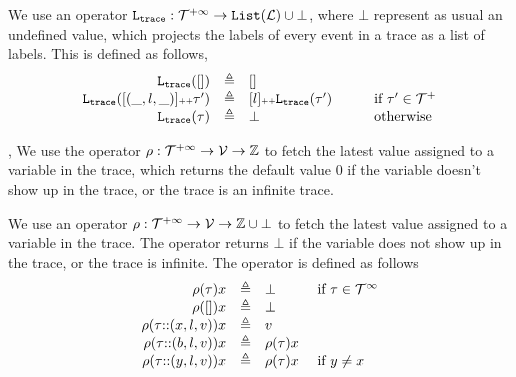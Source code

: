 We use an operator $\mathtt{L}_{\mathtt{{trace}}}: \mathcal{T}^{+\infty} \to \mathtt{List}(\mathcal{L})\cup \bot$, where $\bot$ represent as usual an undefined value, which projects the labels of every event in a trace as a list of labels. This is defined as follows,
\[
\begin{array}{rcll}
\mathtt{L}_{\mathtt{{trace}}}([]) &\triangleq & [] &\qquad  
\\ 
\mathtt{L}_{\mathtt{{trace}}}([(\_, l, \_)] {\scriptscriptstyle ++} \mathtt{\tau}') &\triangleq & [l] {\scriptscriptstyle ++} \mathtt{L}_{\mathtt{{trace}}}(\mathtt{\tau}') &\qquad  \mbox{if}\ \mathtt{\tau}'\in\mathcal{T}^{+}
\\
\mathtt{L}_{\mathtt{{trace}}}(\tau) &\triangleq & \bot  &\qquad  \mbox{otherwise}
\end{array}
\]

%
, 
We use the operator $\rho: {\mathcal{T}^{+\infty}} \to \mathcal{V} \to \mathbb{Z}$ 
 to fetch the latest value assigned to a variable in the trace,
 which returns the default value $0$ if the variable doesn't show up in the trace, or the trace is an infinite trace.


We use an operator $\rho: {\mathcal{T}^{+\infty}} \to \mathcal{V} \to \mathbb{Z}\cup\bot$ to fetch the latest value assigned to a variable in the trace. The operator returns $\bot$ if the variable does not show up in the trace, or the trace is infinite. The operator is defined as follows
    \[
\begin{array}{rcll}
\rho(\mathtt{\tau} ) x &\triangleq& \bot &~ \text{if}~ \mathtt{\tau} \in \mathcal{T}^{\infty}\\
 \rho({[]} ) x &\triangleq& \bot&\\
\rho(\mathtt{\tau}  {\small ::} (x, l, v)) x &\triangleq& v
\\
\rho(\mathtt{\tau} {\small ::} (b, l, v)) x &\triangleq& \rho(\mathtt{\tau}) x
\\
\rho(\mathtt{\tau} {\small ::} (y, l, v)) x &\triangleq& \rho(\mathtt{\tau}) x & ~ \text{if}~ y \neq x
\end{array}
\]
 
